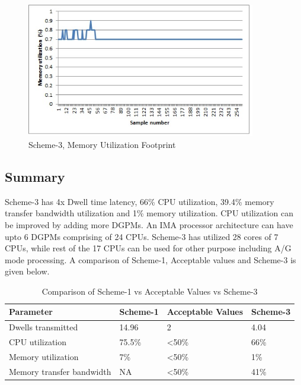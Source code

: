 \begin{figure}[h!]
	\centering
	\includegraphics[width=100mm]{figures/scheme4_mem_util}
	\caption{Scheme-3, Memory Utilization Footprint}
	\label{fig:mm:scheme4_mem_util}
\end{figure}
\FloatBarrier

\subsection{Summary}
\label{ss:mm:scheme4:summary}
Scheme-3 has 4x Dwell time latency, 66\% CPU utilization, 39.4\% memory transfer bandwidth utilization and 1\% memory utilization. CPU utilization can be improved by adding more DGPMs. An IMA processor architecture can have upto 6 DGPMs comprising of 24 CPUs. Scheme-3 has utilized 28 cores of 7 CPUs, while rest of the 17 CPUs can be used for other purpose including A/G mode processing. A comparison of Scheme-1, Acceptable values and Scheme-3 is given below.

\begin{table}[h!]
	\centering
	\begin{tabular}{|l|l|l|l|} 
	 \hline
	 \textbf{Parameter} & \textbf{Scheme-1} & \textbf{Acceptable Values} & \textbf{Scheme-3}\\
	 \hline
	 Dwells transmitted &  14.96 & 2 & 4.04 \\ \hline
	 CPU utilization & 75.5\% & \textless 50\% & 66\% \\ \hline
	 Memory utilization & 7\% & \textless 50\%  & 1\% \\ \hline
	 Memory transfer bandwidth & NA & \textless 50\% & 41\%  \\ \hline
	\end{tabular}
	\caption{Comparison of Scheme-1 vs Acceptable Values vs Scheme-3}
	\label{tbl:mm:scheme4_comparison}
\end{table}

\clearpage
